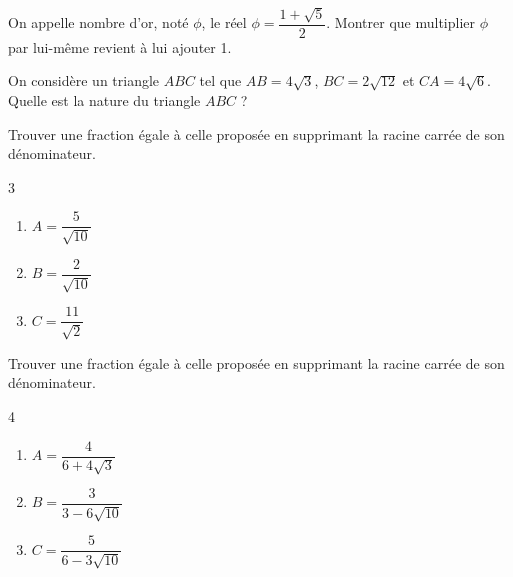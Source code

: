 {\begin{Exercice}
On appelle nombre d’or, noté $\phi$, le réel $\phi = \dfrac{1 + \sqrt{5}}{2}$. Montrer que multiplier $\phi$ par lui-même revient à lui ajouter 1.
\end{Exercice}

\begin{Exercice}
On considère un triangle $ABC$ tel que $AB = 4\sqrt{3}$, $BC = 2\sqrt{12}$ et $CA = 4\sqrt{6}$. Quelle est la nature du triangle $ABC$ ?
\end{Exercice}

\begin{Exercice}Trouver une fraction égale à celle proposée en supprimant la racine carrée de son dénominateur.
\begin{multicols}{3}
\begin{enumerate}[itemsep=1em,label={}]
	\item \begin{minipage}[t]{\linewidth} $A=\dfrac{ 5 }{\sqrt{10}} $ \end{minipage}
	\item \begin{minipage}[t]{\linewidth} $B=\dfrac{ 2 }{\sqrt{10}} $ \end{minipage}
	\item \begin{minipage}[t]{\linewidth} $C=\dfrac{ 11 }{\sqrt{2}} $ \end{minipage}
\end{enumerate}
\end{multicols}
\end{Exercice}

\begin{Exercice}
Trouver une fraction égale à celle proposée en supprimant la racine carrée de son dénominateur.
\begin{multicols}{4}
\begin{enumerate}[itemsep=1em,label={}]
	\item \begin{minipage}[t]{\linewidth} $A=\dfrac{ 4 }{6+4\sqrt{3}} $  \end{minipage}
	\item \begin{minipage}[t]{\linewidth} $B=\dfrac{ 3 }{3-6\sqrt{10}} $  \end{minipage}
	\item \begin{minipage}[t]{\linewidth} $C=\dfrac{ 5 }{6-3\sqrt{10}} $  \end{minipage}
\end{enumerate}
\end{multicols}
\end{Exercice}

}
